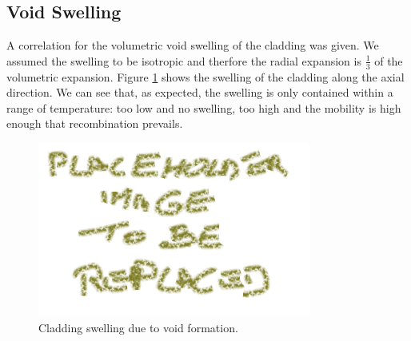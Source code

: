 \subsection{Void Swelling}
A correlation for the volumetric void swelling of the cladding was given. We assumed the swelling to be isotropic and therfore the radial expansion is $\frac{1}{3}$ of the volumetric expansion.
Figure \ref{fig:void_swelling} shows the swelling of the cladding along the axial direction.
We can see that, as expected, the swelling is only contained within a range of temperature: too low and no swelling, too high and the mobility is high enough that recombination prevails.

\begin{figure}[H]
\centering
\includegraphics[width=0.8\textwidth]{placeholder.png}
\caption{Cladding swelling due to void formation.}
\label{fig:void_swelling}
\end{figure}
